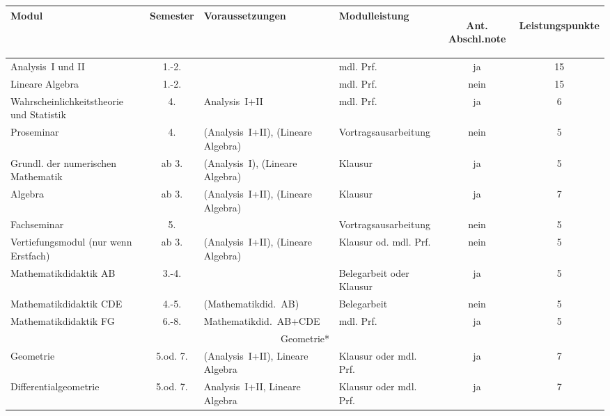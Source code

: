 \begin{table}[tbp]
	\begin{small}
		\begin{tabularx}{\textwidth}{|@{~}X@{~}|@{~}c@{~}|@{~}X@{~}|@{~}X@{~}|@{~}c@{~}|@{~}c@{~}|}
			\hline
			\textbf{Modul} & \textbf{Semes\-ter} & \textbf{Voraus\-setzungen} & \textbf{Modul\-leistung} & \begin{sideways}\textbf{Ant. Abschl.note}\end{sideways} & \begin{sideways}\textbf{Leistungspunkte}\end{sideways}\\\hline\hline
			Analysis~I und II &   1.-2.  &                &   mdl. Prf.   &   ja    &   15\\\hline
			Lineare Algebra &  1.-2.   &         &   mdl. Prf.   &   nein    &   15\\\hline
			Wahr\-schein\-lich\-keits\-theorie und Sta\-tis\-tik&4.&Analysis~I+II&mdl. Prf.&ja&6\\\hline
			Pro\-seminar&4.&(Analy\-sis~I+II), (Lineare Algebra)&Vortrags\-aus\-arbeitung&nein&5\\\hline
			Grundl. der numerischen Mathe\-matik&ab 3.&(Analy\-sis~I), (Lineare Algebra)&Klausur&ja&5\\\hline
			Algebra&ab 3.&(Analy\-sis~I+II), (Lineare Algebra)&Klausur&ja&7\\\hline
			Fach\-seminar&5.&&Vortrags\-aus\-arbeitung&nein&5\\\hline
			Ver\-tiefungs\-modul (nur wenn Erst\-fach)&ab 3.&(Analysis~I+II), (Lineare Algebra)&Klausur od. mdl. Prf.&nein&5\\\hline
			Mathe\-matik\-didaktik AB&3.-4.&&Beleg\-arbeit oder Klausur&ja&5\\\hline
			Mathe\-matik\-didaktik CDE&4.-5.&(Mathe\-matikdid.~AB)&Beleg\-arbeit&nein&5\\\hline
			Mathe\-matik\-didaktik FG&6.-8.&Mathe\-matik\-did.~AB+CDE&mdl. Prf.&ja&5\\\hline\hline
			\multicolumn{6}{|c|}{Geometrie*}\\\hline
			Geometrie&5.od. 7.&(Analysis~I+II), Lineare Algebra&Klausur oder mdl. Prf.&ja&7\\\hline
			Differential\-geometrie&5.od. 7.&Analysis~I+II, Lineare Algebra&Klausur oder mdl. Prf.&ja&7\\\hline\hline

\end{tabularx}
\end{small}
\end{table}
